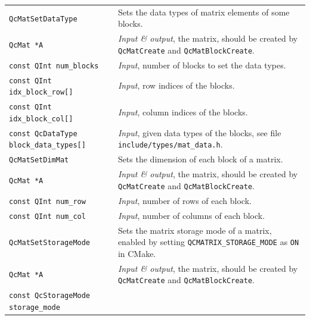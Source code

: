 \documentclass[a4paper,11pt,twoside,openright]{book}
\begin{document}
\begin{center}
\begin{longtable}{l|p{}}
    \hline
%
    \verb|QcMatSetDataType|\index{\texttt{QcMatSetDataType}} %
      & Sets the data types of matrix elements of some blocks.\\
    \hspace*{2ex}\verb|QcMat *A| %
      & \textsl{Input \& output}, the matrix, should be created by \verb|QcMatCreate|
        and \verb|QcMatBlockCreate|.\\
    \hspace*{2ex}\verb|const QInt num_blocks| %
      & \textsl{Input}, number of blocks to set the data types.\\
    \hspace*{2ex}\verb|const QInt idx_block_row[]| %
      & \textsl{Input}, row indices of the blocks.\\
    \hspace*{2ex}\verb|const QInt idx_block_col[]| %
      & \textsl{Input}, column indices of the blocks.\\
    \hspace*{2ex}\verb|const QcDataType block_data_types[]| %
      & \textsl{Input}, given data types of the blocks, see file
        \verb|include/types/mat_data.h|.\\
    \hline
%
    \verb|QcMatSetDimMat|\index{\texttt{QcMatSetDimMat}} %
      & Sets the dimension of each block of a matrix.\\
    \hspace*{2ex}\verb|QcMat *A| %
      & \textsl{Input \& output}, the matrix, should be created by \verb|QcMatCreate|
        and \verb|QcMatBlockCreate|.\\
    \hspace*{2ex}\verb|const QInt num_row| %
      & \textsl{Input}, number of rows of each block.\\
    \hspace*{2ex}\verb|const QInt num_col| %
      & \textsl{Input}, number of columns of each block.\\
    \hline
%
    \verb|QcMatSetStorageMode|\index{\texttt{QcMatSetStorageMode}} %
      & Sets the matrix storage mode of a matrix, enabled by setting
        \verb|QCMATRIX_STORAGE_MODE| as \verb|ON| in CMake.\\
    \hspace*{2ex}\verb|QcMat *A| %
      & \textsl{Input \& output}, the matrix, should be created by \verb|QcMatCreate|
        and \verb|QcMatBlockCreate|.\\
    \hspace*{2ex}\verb|const QcStorageMode storage_mode| %

\end{longtable}
\end{center}
\end{document}
